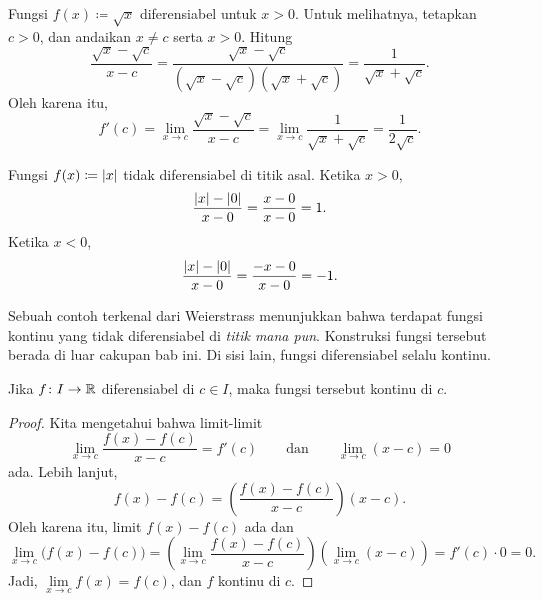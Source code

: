 \begin{example}
Fungsi $f(x) \coloneqq \sqrt{x}$ diferensiabel untuk $x > 0$.  Untuk melihatnya,
tetapkan $c > 0$,
dan andaikan $x \neq c$ serta $x > 0$.  Hitung
\begin{equation*}
\frac{\sqrt{x}-\sqrt{c}}{x-c}
=
\frac{\sqrt{x}-\sqrt{c}}{(\sqrt{x}-\sqrt{c})(\sqrt{x}+\sqrt{c})}
=
\frac{1}{\sqrt{x}+\sqrt{c}} .
\end{equation*}
Oleh karena itu,
\begin{equation*}
f'(c) =
\lim_{x\to c}
\frac{\sqrt{x}-\sqrt{c}}{x-c}
=
\lim_{x\to c}
\frac{1}{\sqrt{x}+\sqrt{c}}
=
\frac{1}{2\sqrt{c}} .
\end{equation*}
\end{example}

\begin{example}
Fungsi $f(x) \coloneqq \lvert {x} \rvert$ tidak diferensiabel
di titik asal.  Ketika $x > 0$,
\begin{equation*}
\frac{\lvert {x} \rvert-\lvert {0} \rvert}{x-0} =
\frac{x-0}{x-0} = 1 .
\end{equation*}
Ketika $x < 0$,
\begin{equation*}
\frac{\lvert {x} \rvert-\lvert {0} \rvert}{x-0} =
\frac{-x-0}{x-0} = -1 .
\end{equation*}
\end{example}

Sebuah contoh terkenal dari Weierstrass menunjukkan bahwa terdapat fungsi kontinu
yang tidak diferensiabel di \emph{titik mana pun}.  Konstruksi
fungsi tersebut berada di luar cakupan bab ini.  Di sisi lain,
fungsi diferensiabel selalu kontinu.

\begin{prop}
Jika $f \colon I \to {\mathbb{R}}$ diferensiabel di $c \in I$,
maka fungsi tersebut kontinu di $c$.
\end{prop}

\begin{proof}
Kita mengetahui bahwa limit-limit
\begin{equation*}
\lim_{x\to c}\frac{f(x)-f(c)}{x-c} = f'(c)
\qquad
\text{dan}
\qquad
\lim_{x\to c}(x-c) = 0
\end{equation*}
ada.  Lebih lanjut,
\begin{equation*}
f(x)-f(c) = 
\left( \frac{f(x)-f(c)}{x-c} \right) (x-c) .
\end{equation*}
Oleh karena itu, limit $f(x)-f(c)$ ada dan
\begin{equation*}
\lim_{x\to c} \bigl( f(x)-f(c) \bigr) =
\left(\lim_{x\to c} \frac{f(x)-f(c)}{x-c} \right)
\left(\lim_{x\to c} (x-c) \right) =
f'(c) \cdot 0  = 0.
\end{equation*}
Jadi, $\lim\limits_{x\to c} f(x) = f(c)$, dan $f$ kontinu di $c$.
\end{proof}

